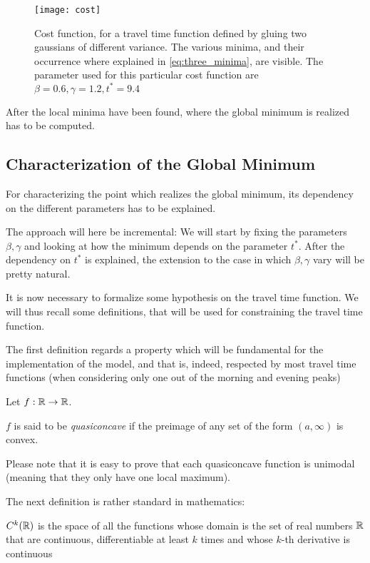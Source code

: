 \begin{figure}
  \centering
  \texttt{[image: cost]}
  \caption{Cost function, for a travel time function defined by gluing two gaussians of different variance.
    The various minima, and their occurrence where explained in \eqref{eq:three_minima},
    are visible.
  The parameter used for this particular cost function are \(\beta = 0.6, \gamma = 1.2, t^* = 9.4\)}
  \label{fig:cost}
\end{figure}

After the local minima have been found,
where the global minimum is realized has to be computed.

\subsection{Characterization of the Global Minimum}
\label{sec:glob_min}

For characterizing the point which realizes the global minimum,
its dependency on the different parameters has to be explained.

The approach will here be incremental:
We will start by fixing the parameters \(\beta, \gamma\) and looking at how the minimum depends on the parameter \(t^*\).
After the dependency on \(t^*\) is explained, the extension to the case in which \(\beta, \gamma\) vary will be pretty natural.

It is now necessary to formalize some hypothesis on the travel time function.
We will thus recall some definitions, that will be used for constraining the travel time function.

The first definition regards a property which will be fundamental for the implementation of the model,
and that is, indeed, respected by most travel time functions (when considering only one out of the morning and evening peaks)
\begin{definition}
  Let \(f:\mathbb{R} \rightarrow \mathbb{R}\).
  
  \(f\) is said to be \textit{quasiconcave} if the preimage of any set of the form \((a, \infty)\) is convex.
\end{definition}

Please note that it is easy to prove that each quasiconcave function is unimodal (meaning that they only have one local maximum).

The next definition is rather standard in mathematics:
\begin{definition}
  \(C^k(\mathbb{R})\) is the space of all the functions whose domain is the set of real numbers \(\mathbb{R}\) that are continuous, differentiable at least \(k\) times and whose \(k\)-th derivative is continuous
\end{definition}

